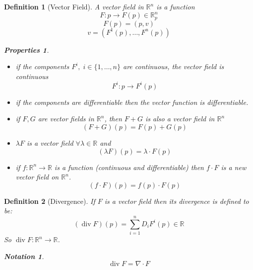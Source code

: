 \documentclass[11pt]{article}
\def\RR{\mathbb{R}}
\DeclareMathOperator{\dive}{div}
\newtheorem{definition}{Definition}[section]
\newtheorem*{properties}{Properties}
\newtheorem*{notation}{Notation}
\begin{document}
\begin{definition}[Vector Field]
A vector field in $\RR^n$ is a function
\[F:p \rightarrow F(p)\in \RR_p^n\]
\[F(p) = (p,v)\]
\[v=(F^1(p), \dots , F^n(p))\]
\begin{properties} \quad \\
\begin{itemize}
\item if the components $F^i, \; i \in \{1, \dots, n\}$ are continuous, the vector field is continuous
\[F^i:p\rightarrow F^i(p)\]
\item if the components are differentiable then the vector function is differentiable.
\item if $F,G$ are vector fields in $\RR^n$, then $F+G$ is also a vector field in $\RR^n$
\[(F+G)(p) = F(p) + G(p)\]
\item $\lambda F$ is a vector field $\forall \lambda \in \RR$ and 
\[ (\lambda F)(p) = \lambda \cdot F(p)\]
\item if $f:\RR^n \rightarrow \RR$ is a function (continuous and differentiable) then $f\cdot F$ is a new vector field on $\RR^n$.
\[(f\cdot F)(p) = f(p)\cdot F(p)\]
\end{itemize}
\end{properties}
\end{definition}

\begin{definition}[Divergence]
If $F$ is a vector field then its divergence is defined to be:
\[(\dive F )(p) = \sum\limits_{i=1}^{n}D_iF^i(p) \in \RR\]
So $\dive F : \RR^n \rightarrow  \RR$. 
\begin{notation} \[\dive F = \nabla \cdot F\] \end{notation}
\end{definition}
\end{document}
